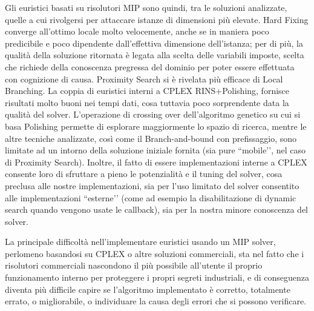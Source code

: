 Gli euristici basati su risolutori MIP sono quindi, tra le soluzioni analizzate, quelle a cui rivolgersi per attaccare istanze di dimensioni più elevate. Hard Fixing converge all’ottimo locale molto velocemente, anche se in maniera poco predicibile e poco dipendente dall’effettiva dimensione dell’istanza; per di più, la qualità della soluzione ritornata è legata alla scelta delle variabili imposte, scelta che richiede della conoscenza pregressa del dominio per poter essere effettuata con cognizione di causa. Proximity Search si è rivelata più efficace di Local Branching. La coppia di euristici interni a CPLEX RINS+Polishing, fornisce risultati molto buoni nei tempi dati, cosa tuttavia poco sorprendente data la qualità del solver. L’operazione di crossing over dell’algoritmo genetico su cui si basa Polishing permette di esplorare maggiormente lo spazio di ricerca, mentre le altre tecniche analizzate, così come il Branch-and-bound con prefissaggio, sono limitate ad un intorno della soluzione iniziale fornita (sia pure ``mobile’’, nel caso di Proximity Search). Inoltre, il fatto di essere implementazioni interne a CPLEX consente loro di sfruttare a pieno le potenzialità e il tuning del solver, cosa preclusa alle nostre implementazioni, sia per l’uso limitato del solver consentito alle implementazioni ``esterne’’ (come ad esempio la disabilitazione di dynamic search quando vengono usate le callback), sia per la nostra minore conoscenza del solver.

La principale difficoltà nell’implementare euristici usando un MIP solver, perlomeno basandosi su CPLEX o altre soluzioni commerciali, sta nel fatto che i risolutori commerciali nascondono il più possibile all’utente il proprio funzionamento interno per proteggere i propri segreti industriali, e di conseguenza diventa più difficile capire se l’algoritmo implementato è corretto, totalmente errato, o migliorabile, o individuare la causa degli errori che si possono verificare.
